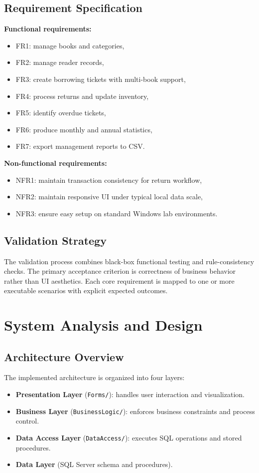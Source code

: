 \documentclass[12pt,a4paper]{article}
\begin{document}
\subsection{Requirement Specification}
\textbf{Functional requirements:}
\begin{itemize}[leftmargin=1.5cm]
    \item FR1: manage books and categories,
    \item FR2: manage reader records,
    \item FR3: create borrowing tickets with multi-book support,
    \item FR4: process returns and update inventory,
    \item FR5: identify overdue tickets,
    \item FR6: produce monthly and annual statistics,
    \item FR7: export management reports to CSV.
\end{itemize}

\textbf{Non-functional requirements:}
\begin{itemize}[leftmargin=1.5cm]
    \item NFR1: maintain transaction consistency for return workflow,
    \item NFR2: maintain responsive UI under typical local data scale,
    \item NFR3: ensure easy setup on standard Windows lab environments.
\end{itemize}

\subsection{Validation Strategy}
The validation process combines black-box functional testing and rule-consistency checks. The primary acceptance criterion is correctness of business behavior rather than UI aesthetics. Each core requirement is mapped to one or more executable scenarios with explicit expected outcomes.

\section{System Analysis and Design}
\subsection{Architecture Overview}
The implemented architecture is organized into four layers:
\begin{itemize}[leftmargin=1.5cm]
    \item \textbf{Presentation Layer} (\texttt{Forms/}): handles user interaction and visualization.
    \item \textbf{Business Layer} (\texttt{BusinessLogic/}): enforces business constraints and process control.
    \item \textbf{Data Access Layer} (\texttt{DataAccess/}): executes SQL operations and stored procedures.
    \item \textbf{Data Layer} (SQL Server schema and procedures).
\end{itemize}
\end{document}
